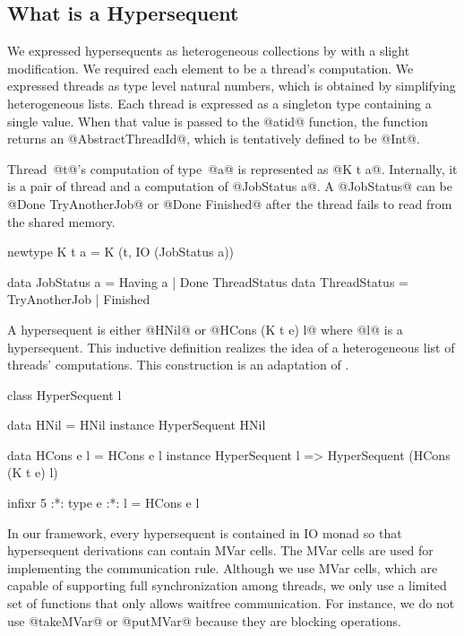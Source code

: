 \documentclass[doctor]{iscs-thesis}
\begin{document}
\subsection{What is a Hypersequent}
We expressed hypersequents as heterogeneous collections by \citet{hetero}
with a slight modification.  We required each element to be a thread's
computation. 
We expressed threads as type level natural numbers, which is obtained by
simplifying heterogeneous lists.
Each thread is expressed as a singleton type containing a single value.
When that value is passed to the @atid@ function, the function returns
an @AbstractThreadId@, which is tentatively defined to be @Int@.
Thread~@t@'s computation of type~@a@ is represented as @K t a@.
Internally, it is a pair of thread and a computation of @JobStatus a@.
A @JobStatus@ can be @Done TryAnotherJob@ or @Done Finished@ after the
thread fails to read from the shared memory.
\begin{code}
newtype K t a = K (t, IO (JobStatus a)) 

data JobStatus a = Having a | Done ThreadStatus
data ThreadStatus = TryAnotherJob | Finished
\end{code}
A hypersequent is either @HNil@ or @HCons (K t e) l@ where @l@ is a
hypersequent.  This inductive definition realizes the idea of a
heterogeneous list of threads' computations.  This construction is an
adaptation of \citep{hetero}.
\begin{code}
class HyperSequent l

data HNil = HNil
instance HyperSequent HNil

data HCons e l = HCons e l
instance HyperSequent l =>
  HyperSequent (HCons (K t e) l)

infixr 5 :*:
type e :*: l = HCons e l
\end{code}
In our framework, every hypersequent is contained in IO monad 
so that hypersequent derivations can contain MVar
cells. The MVar cells are used for implementing the communication
rule. Although we use MVar cells, which are capable of supporting full
synchronization among threads, we only use a limited set of functions
that only allows waitfree communication. For instance, we do not use
@takeMVar@ or @putMVar@ because they are blocking operations.
\end{document}
